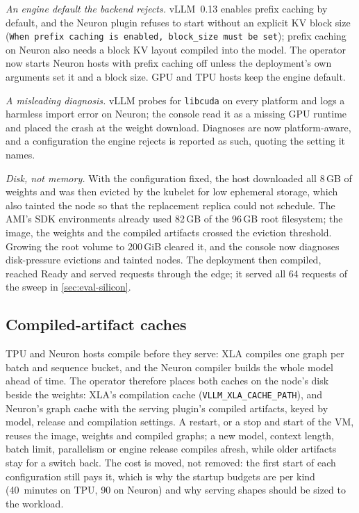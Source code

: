 \documentclass[conference,letterpaper]{IEEEtran}
\newcommand{\code}[1]{\texttt{\small #1}}
\begin{document}
\emph{An engine default the backend rejects.} vLLM~0.13 enables prefix caching by default, and
the Neuron plugin refuses to start without an explicit KV block size
(\code{When prefix caching is enabled, block\_size must be set}); prefix caching on Neuron also
needs a block KV layout compiled into the model. The operator now starts Neuron hosts with prefix
caching off unless the deployment's own arguments set it and a block size. GPU and TPU hosts keep
the engine default.

\emph{A misleading diagnosis.} vLLM probes for \code{libcuda} on every platform and logs a
harmless import error on Neuron; the console read it as a missing GPU runtime and placed the
crash at the weight download. Diagnoses are now platform-aware, and a configuration the engine
rejects is reported as such, quoting the setting it names.

\emph{Disk, not memory.} With the configuration fixed, the host downloaded all 8\,GB of weights
and was then evicted by the kubelet for low ephemeral storage, which also tainted the node so that
the replacement replica could not schedule. The AMI's SDK environments already used 82\,GB of the
96\,GB root filesystem; the image, the weights and the compiled artifacts crossed the eviction
threshold. Growing the root volume to 200\,GiB cleared it, and the console now diagnoses
disk-pressure evictions and tainted nodes. The deployment then compiled, reached Ready and served
requests through the edge; it served all 64 requests of the sweep in \cref{sec:eval-silicon}.

\subsection{Compiled-artifact caches}
\label{sec:compile-cache}
TPU and Neuron hosts compile before they serve: XLA compiles one graph per batch and sequence
bucket, and the Neuron compiler builds the whole model ahead of time. The operator therefore
places both caches on the node's disk beside the weights: XLA's compilation cache
(\code{VLLM\_XLA\_CACHE\_PATH}), and Neuron's graph cache with the serving plugin's compiled
artifacts, keyed by model, release and compilation settings. A restart, or a stop and start of
the VM, reuses the image, weights and compiled graphs; a new model, context length, batch limit,
parallelism or engine release compiles afresh, while older artifacts stay for a switch back. The
cost is moved, not removed: the first start of each configuration still pays it, which is why
the startup budgets are per kind (40~minutes on TPU, 90 on Neuron) and why serving shapes should
be sized to the workload.
\end{document}
